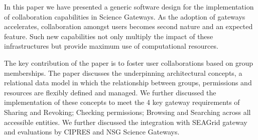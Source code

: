 \documentclass[sigconf]{acmart}
\begin{document}
In this paper we have presented a generic software design for the implementation of collaboration capabilities in Science Gateways. As the adoption of gateways accelerates, collaboration amongst users becomes second nature and an expected feature. Such new capabilities not only multiply the impact of these infrastructures but provide maximum use of computational resources. 

The key contribution of the paper is to foster user collaborations based on group memberships. The paper discusses the underpinning architectural concepts, a relational data model in which the relationship between groups, permissions and resources are flexibly defined and managed. We further discussed the implementation of these concepts to meet the 4 key gateway requirements of Sharing and Revoking; Checking permissions; Browsing and Searching across all accessible entities. We further discussed the integration with SEAGrid gateway and evaluations by CIPRES and NSG Science Gateways. 

%
%


 
\end{document}

